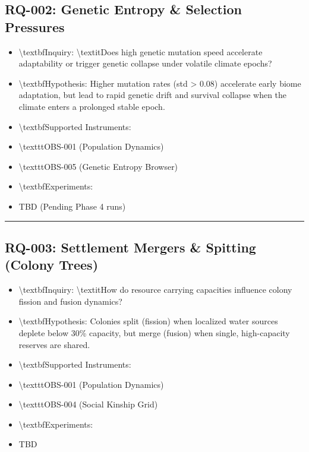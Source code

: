 \documentclass[11pt,a4paper]{article}
\begin{document}
\subsection*{RQ-002: Genetic Entropy \& Selection Pressures}
\begin{itemize}
  \item \textbackslash{}textbf{Inquiry}: \textbackslash{}textit{Does high genetic mutation speed accelerate adaptability or trigger genetic collapse under volatile climate epochs?}
  \item \textbackslash{}textbf{Hypothesis}: Higher mutation rates (std \textgreater{} 0.08) accelerate early biome adaptation, but lead to rapid genetic drift and survival collapse when the climate enters a prolonged stable epoch.
  \item \textbackslash{}textbf{Supported Instruments}:
  \item \textbackslash{}texttt{OBS-001} (Population Dynamics)
  \item \textbackslash{}texttt{OBS-005} (Genetic Entropy Browser)
  \item \textbackslash{}textbf{Experiments}:
  \item TBD (Pending Phase 4 runs)
\end{itemize}

\noindent\rule{\textwidth}{0.4pt}

\subsection*{RQ-003: Settlement Mergers \& Spitting (Colony Trees)}
\begin{itemize}
  \item \textbackslash{}textbf{Inquiry}: \textbackslash{}textit{How do resource carrying capacities influence colony fission and fusion dynamics?}
  \item \textbackslash{}textbf{Hypothesis}: Colonies split (fission) when localized water sources deplete below 30\% capacity, but merge (fusion) when single, high-capacity reserves are shared.
  \item \textbackslash{}textbf{Supported Instruments}:
  \item \textbackslash{}texttt{OBS-001} (Population Dynamics)
  \item \textbackslash{}texttt{OBS-004} (Social Kinship Grid)
  \item \textbackslash{}textbf{Experiments}:
  \item TBD
\end{itemize}
\end{document}
